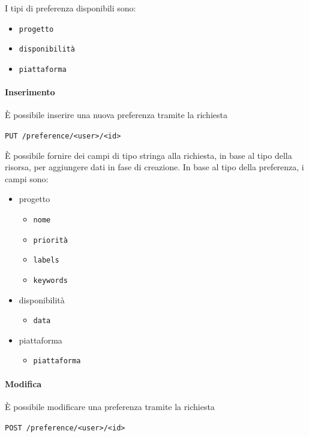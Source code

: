 I tipi di preferenza disponibili sono:
\begin{itemize}[noitemsep]
    \item \texttt{progetto}
    \item \texttt{disponibilità}
    \item \texttt{piattaforma}
\end{itemize}

\paragraph{Inserimento}
È possibile inserire una nuova preferenza tramite la richiesta
    \begin{center}
        \texttt{PUT /preference/<user>/<id>}
    \end{center}

È possibile fornire dei campi di tipo stringa alla richiesta, in base al tipo della risorsa, per aggiungere dati in fase di creazione.
In base al tipo della preferenza, i campi sono:
\begin{itemize}[noitemsep]
    \item progetto
        \begin{itemize}[noitemsep]
            \item \texttt{nome}
            \item \texttt{priorità}
            \item \texttt{labels}
            \item \texttt{keywords}
        \end{itemize}
    \item disponibilità
        \begin{itemize}[noitemsep]
            \item \texttt{data}
        \end{itemize}
    \item piattaforma
        \begin{itemize}[noitemsep]
            \item \texttt{piattaforma}
        \end{itemize}
\end{itemize}


\paragraph{Modifica}

È possibile modificare una preferenza tramite la richiesta
\begin{center}
    \texttt{POST /preference/<user>/<id>}
\end{center}


